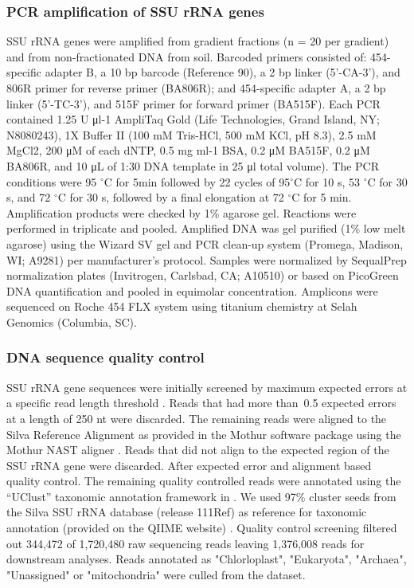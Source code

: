 \documentclass{article}
\begin{document}
\subsubsection{PCR amplification of SSU rRNA genes} 
SSU rRNA genes were amplified from gradient fractions (n = 20 per
gradient) and from non-fractionated DNA from soil. Barcoded primers
consisted of: 454-specific adapter B, a 10 bp barcode (Reference
90), a 2 bp linker (5’-CA-3’), and 806R primer for reverse primer
(BA806R); and 454-specific adapter A, a 2 bp linker (5’-TC-3’), and 515F
primer for forward primer (BA515F). Each PCR contained 1.25 U μl-1
AmpliTaq Gold (Life Technologies, Grand Island, NY; N8080243), 1X Buffer
II (100 mM Tris-HCl, 500 mM KCl, pH
8.3), 2.5 mM MgCl2, 200 μM of each dNTP, 0.5 mg ml-1 BSA, 0.2 μM BA515F, 0.2 μM
BA806R, and 10 μL of 1:30 DNA template in 25 μl total volume). The PCR
conditions were 95 $^{\circ}$C for 5min followed by 22 cycles of 95$^{\circ}$C
for 10 s, 53 $^{\circ}$C for 30 s, and 72 $^{\circ}$C for 30 s, followed by
a final elongation at 72 $^{\circ}$C for 5 min. Amplification products were
checked by 1\% agarose gel. Reactions were performed in triplicate and pooled.
Amplified DNA was gel purified (1\% low melt agarose) using the Wizard SV gel
and PCR clean-up system (Promega, Madison, WI; A9281) per manufacturer’s
protocol. Samples were normalized by SequalPrep normalization plates
(Invitrogen, Carlsbad, CA; A10510) or based on PicoGreen DNA quantification and
pooled in equimolar concentration. Amplicons were sequenced on Roche 454 FLX
system using titanium chemistry at Selah Genomics (Columbia, SC).

\subsubsection{DNA sequence quality control}
SSU rRNA gene sequences were initially screened by maximum expected errors
at a specific read length threshold \citep{edgar2013}. Reads that had more
than~0.5 expected errors at a length of 250 nt were discarded. The
remaining reads were aligned to the Silva Reference Alignment as provided
in the Mothur software package using the Mothur NAST aligner
\citep{DeSantis2005,schloss2009}. Reads that did not align to the expected
region of the SSU rRNA gene were discarded. After expected error and
alignment based quality control. The remaining quality controlled reads
were annotated using the “UClust” taxonomic annotation framework in
\citep{caporaso2010,edgar2010}. We used 97\% cluster seeds from the Silva
SSU rRNA database (release 111Ref) \citep{quast2013} as reference for
taxonomic annotation (provided on the QIIME website) \citep{quast2013}.
Quality control screening filtered out 344,472 of 1,720,480 raw sequencing
reads leaving 1,376,008 reads for downstream analyses. Reads annotated as
"Chlorloplast", "Eukaryota", "Archaea", "Unassigned" or "mitochondria" were
culled from the dataset. 
\end{document}
